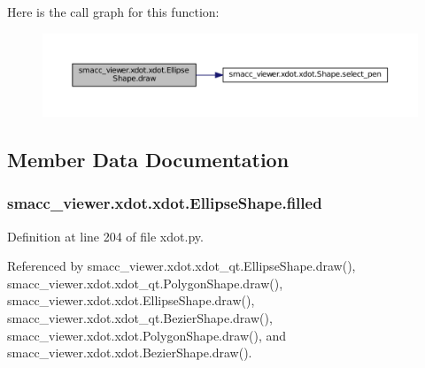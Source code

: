 Here is the call graph for this function\+:
\nopagebreak
\begin{figure}[H]
\begin{center}
\leavevmode
\includegraphics[width=350pt]{classsmacc__viewer_1_1xdot_1_1xdot_1_1EllipseShape_afa10be5f1a695b54b1bdf009fc5b9968_cgraph}
\end{center}
\end{figure}




\subsection{Member Data Documentation}
\subsubsection[{\texorpdfstring{filled}{filled}}]{\setlength{\rightskip}{0pt plus 5cm}smacc\+\_\+viewer.\+xdot.\+xdot.\+Ellipse\+Shape.\+filled}\hypertarget{classsmacc__viewer_1_1xdot_1_1xdot_1_1EllipseShape_a3c929ec9287afe862e714a9190a04eda}{}\label{classsmacc__viewer_1_1xdot_1_1xdot_1_1EllipseShape_a3c929ec9287afe862e714a9190a04eda}


Definition at line 204 of file xdot.\+py.



Referenced by smacc\+\_\+viewer.\+xdot.\+xdot\+\_\+qt.\+Ellipse\+Shape.\+draw(), smacc\+\_\+viewer.\+xdot.\+xdot\+\_\+qt.\+Polygon\+Shape.\+draw(), smacc\+\_\+viewer.\+xdot.\+xdot.\+Ellipse\+Shape.\+draw(), smacc\+\_\+viewer.\+xdot.\+xdot\+\_\+qt.\+Bezier\+Shape.\+draw(), smacc\+\_\+viewer.\+xdot.\+xdot.\+Polygon\+Shape.\+draw(), and smacc\+\_\+viewer.\+xdot.\+xdot.\+Bezier\+Shape.\+draw().

